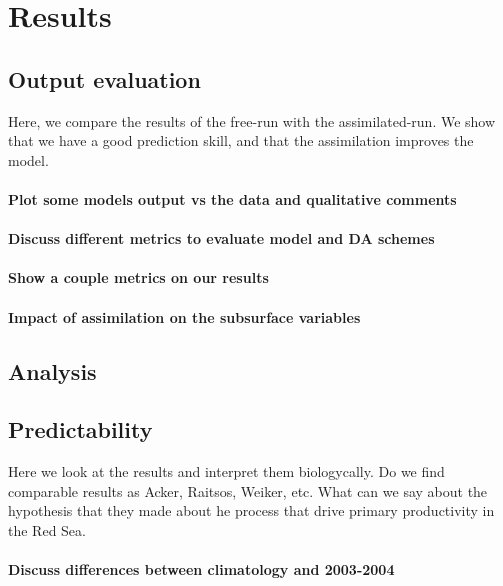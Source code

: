 \section{Results}

\subsection{Output evaluation}

Here, we compare the results of the free-run with the assimilated-run.
We show that we have a good prediction skill, and that the assimilation
improves the model.

\paragraph{Plot some models output vs the data and qualitative comments}

\paragraph{Discuss different metrics to evaluate model and DA schemes}

\paragraph{Show a couple metrics on our results}

\paragraph{Impact of assimilation on the subsurface variables}

\subsection{Analysis}

\subsection{Predictability}

Here we look at the results and interpret them biologycally. Do we find
comparable results as Acker, Raitsos, Weiker, etc. What can we say about the
hypothesis that they made about he process that drive primary productivity in
the Red Sea.

\paragraph{Discuss differences between climatology and 2003-2004}


